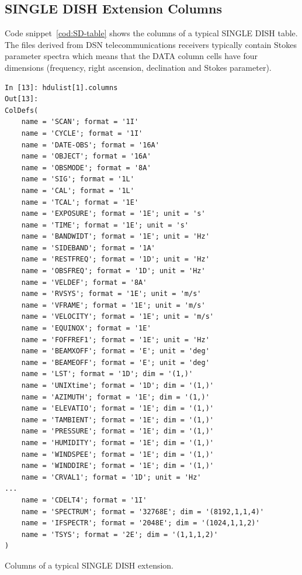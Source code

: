\documentclass[letterpaper,11pt]{book}
\begin{document}
\subsection{SINGLE DISH Extension Columns}

Code snippet~\ref{cod:SD-table} shows the columns of a typical SINGLE DISH table.
The files derived from DSN telecommunications receivers typically contain Stokes
parameter spectra which means that the DATA column cells have four dimensions 
(frequency, right ascension, declination and Stokes parameter).
\begin{code}[h!tb]
\begin{center}
{\scriptsize \begin{verbatim}
In [13]: hdulist[1].columns
Out[13]: 
ColDefs(
    name = 'SCAN'; format = '1I'
    name = 'CYCLE'; format = '1I'
    name = 'DATE-OBS'; format = '16A'
    name = 'OBJECT'; format = '16A'
    name = 'OBSMODE'; format = '8A'
    name = 'SIG'; format = '1L'
    name = 'CAL'; format = '1L'
    name = 'TCAL'; format = '1E'
    name = 'EXPOSURE'; format = '1E'; unit = 's'
    name = 'TIME'; format = '1E'; unit = 's'
    name = 'BANDWIDT'; format = '1E'; unit = 'Hz'
    name = 'SIDEBAND'; format = '1A'
    name = 'RESTFREQ'; format = '1D'; unit = 'Hz'
    name = 'OBSFREQ'; format = '1D'; unit = 'Hz'
    name = 'VELDEF'; format = '8A'
    name = 'RVSYS'; format = '1E'; unit = 'm/s'
    name = 'VFRAME'; format = '1E'; unit = 'm/s'
    name = 'VELOCITY'; format = '1E'; unit = 'm/s'
    name = 'EQUINOX'; format = '1E'
    name = 'FOFFREF1'; format = '1E'; unit = 'Hz'
    name = 'BEAMXOFF'; format = 'E'; unit = 'deg'
    name = 'BEAMEOFF'; format = 'E'; unit = 'deg'
    name = 'LST'; format = '1D'; dim = '(1,)'
    name = 'UNIXtime'; format = '1D'; dim = '(1,)'
    name = 'AZIMUTH'; format = '1E'; dim = '(1,)'
    name = 'ELEVATIO'; format = '1E'; dim = '(1,)'
    name = 'TAMBIENT'; format = '1E'; dim = '(1,)'
    name = 'PRESSURE'; format = '1E'; dim = '(1,)'
    name = 'HUMIDITY'; format = '1E'; dim = '(1,)'
    name = 'WINDSPEE'; format = '1E'; dim = '(1,)'
    name = 'WINDDIRE'; format = '1E'; dim = '(1,)'
    name = 'CRVAL1'; format = '1D'; unit = 'Hz'
...
    name = 'CDELT4'; format = '1I'
    name = 'SPECTRUM'; format = '32768E'; dim = '(8192,1,1,4)'
    name = 'IFSPECTR'; format = '2048E'; dim = '(1024,1,1,2)'
    name = 'TSYS'; format = '2E'; dim = '(1,1,1,2)'
)\end{verbatim}
}\caption{\label{cod:SD-table}Columns of a typical SINGLE DISH
extension.}
\end{center}
\end{code}
\end{document}
